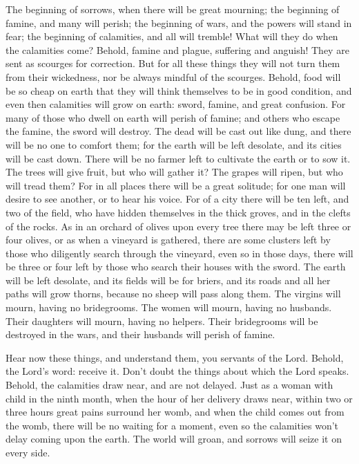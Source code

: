  The beginning of sorrows, when there will be great
mourning; the beginning of famine, and many will perish; the beginning
of wars, and the powers will stand in fear; the beginning of calamities,
and all will tremble! What will they do when the calamities come?
 Behold, famine and plague, suffering and anguish! They
are sent as scourges for correction.  But for all these
things they will not turn them from their wickedness, nor be always
mindful of the scourges.  Behold, food will be so cheap
on earth that they will think themselves to be in good condition, and
even then calamities will grow on earth: sword, famine, and great
confusion.  For many of those who dwell on earth will
perish of famine; and others who escape the famine, the sword will
destroy.  The dead will be cast out like dung, and there
will be no one to comfort them; for the earth will be left desolate, and
its cities will be cast down.  There will be no farmer
left to cultivate the earth or to sow it.  The trees will
give fruit, but who will gather it?  The grapes will
ripen, but who will tread them? For in all places there will be a great
solitude;  for one man will desire to see another, or to
hear his voice.  For of a city there will be ten left,
and two of the field, who have hidden themselves in the thick groves,
and in the clefts of the rocks.  As in an orchard of
olives upon every tree there may be left three or four olives,
 or as when a vineyard is gathered, there are some
clusters left by those who diligently search through the vineyard,
 even so in those days, there will be three or four left
by those who search their houses with the sword.  The
earth will be left desolate, and its fields will be for briers, and its
roads and all her paths will grow thorns, because no sheep will pass
along them.  The virgins will mourn, having no
bridegrooms. The women will mourn, having no husbands. Their daughters
will mourn, having no helpers.  Their bridegrooms will be
destroyed in the wars, and their husbands will perish of famine.

 Hear now these things, and understand them, you servants
of the Lord.  Behold, the Lord's word: receive it. Don't
doubt the things about which the Lord speaks.  Behold,
the calamities draw near, and are not delayed.  Just as a
woman with child in the ninth month, when the hour of her delivery draws
near, within two or three hours great pains surround her womb, and when
the child comes out from the womb, there will be no waiting for a
moment,  even so the calamities won't delay coming upon
the earth. The world will groan, and sorrows will seize it on every
side.

